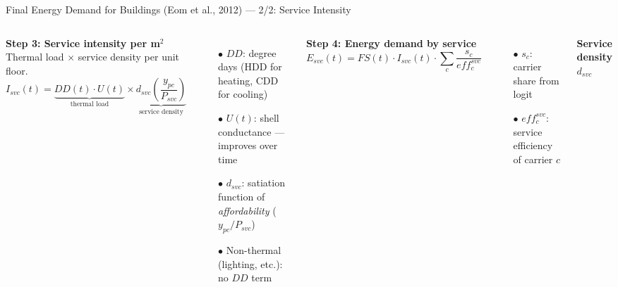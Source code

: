 \documentclass[aspectratio=169, 10pt]{beamer}
\begin{document}
\begin{frame}[t]{Final Energy Demand for Buildings (Eom et al., 2012) --- 2/2: Service Intensity}
\begin{columns}[T]
\small
\vspace{0.1em}

\textbf{Step 3: Service intensity per m$^2$}\\[1pt]
{\scriptsize Thermal load $\times$ service density per unit floor.}
\vspace{-0.4em}
$$I_{svc}(t) = \underbrace{DD(t) \cdot U(t)}_{\text{thermal load}} \times \underbrace{d_{svc}\!\left(\frac{y_{pc}}{P_{svc}}\right)}_{\text{service density}}$$
\vspace{-1.2em}
\begin{itemize}\setlength\itemsep{1pt}\setlength\parsep{0pt}
\item[\scriptsize$\bullet$] {\scriptsize $DD$: degree days (HDD for heating, CDD for cooling)}
\item[\scriptsize$\bullet$] {\scriptsize $U(t)$: shell conductance --- improves over time}
\item[\scriptsize$\bullet$] {\scriptsize $d_{svc}$: satiation function of \textit{affordability} ($y_{pc}/P_{svc}$)}
\item[\scriptsize$\bullet$] {\scriptsize Non-thermal (lighting, etc.): no $DD$ term}
\end{itemize}

\vspace{0.2em}
\textbf{Step 4: Energy demand by service}
\vspace{-0.4em}
$$E_{svc}(t) = FS(t) \cdot I_{svc}(t) \cdot \sum_c \frac{s_c}{eff_c^{svc}}$$
\vspace{-1.2em}
\begin{itemize}\setlength\itemsep{1pt}\setlength\parsep{0pt}
\item[\scriptsize$\bullet$] {\scriptsize $s_c$: carrier share from logit}
\item[\scriptsize$\bullet$] {\scriptsize $eff_c^{svc}$: service efficiency of carrier $c$}
\end{itemize}

\centering
\vspace{0.2em}
{\footnotesize\bfseries Service density $d_{svc}$}\\[3pt]


\end{columns}
\end{frame}
\end{document}
